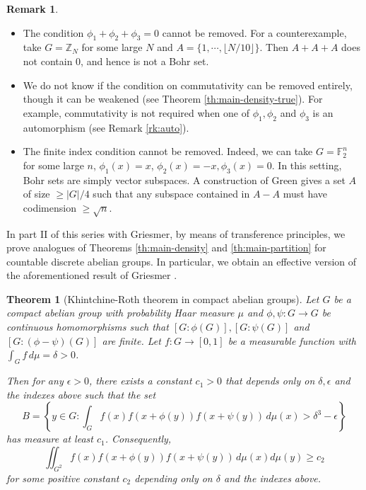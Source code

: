 \documentclass[10pt]{article}
\newtheorem{theorem}{Theorem}[section]
\theoremstyle{definition}
\newtheorem{remark}{Remark}
\newcommand{\Z}{\mathbb{Z}}
\newcommand{\F}{\mathbb{F}}
\begin{document}
\begin{remark}\label{remark:density_commutative}\
\begin{itemize}[leftmargin=*]
\item The condition $\phi_1 + \phi_2 + \phi_3 = 0$ cannot be removed. For a counterexample, take $G=\Z_N$ for some large $N$ and $A = \{1, \cdots, \lfloor N/10 \rfloor\}$. Then $A+A+A$ does not contain 0, and hence is not a Bohr set.
\item We do not know if the condition on commutativity can be removed entirely, though it can be weakened (see Theorem \ref{th:main-density-true}). For example, commutativity is not required when one of $\phi_1, \phi_2$ and $\phi_3$ is an automorphism (see Remark \ref{rk:auto}).
\item The finite index condition cannot be removed. Indeed, we can take $G = \F_2^n$ for some large $n$, $\phi_1(x)= x$, $\phi_2(x)=-x, \phi_3(x)=0$. In this setting, Bohr sets are simply vector subspaces. A construction of Green \cite[Theorem 9.4]{green-ff} gives a set $A$ of size $\geq |G|/4$ such that any subspace contained in $A-A$ must have codimension $\geq \sqrt{n}$.  
\end{itemize}
\end{remark}

In part II of this series \cite{Griesmer-Le-Le-countable} with Griesmer, by means of transference principles, we prove analogues of Theorems \ref{th:main-density} and \ref{th:main-partition} for countable discrete abelian groups. 
In particular, we obtain an effective version of the aforementioned result of Griesmer \cite{griesmer-br}. %
\setcounter{theorem}{8}\setcounter{equation}{2}
\begin{theorem}[Khintchine-Roth theorem in compact abelian groups]
\label{th:roth-khintchine}
Let $G$ be a compact abelian group with  probability Haar measure $\mu$ and $\phi, \psi: G \to G$ be continuous homomorphisms such that $[G: \phi(G)], [G: \psi(G)]$ and $[G: (\phi-\psi)(G)]$ are finite. 
Let $f: G \to [0, 1]$ be a measurable function with $\int_G f \, d \mu = \delta >0$.
 
Then for any $\epsilon > 0$, there exists a constant $c_1 >0$ that depends only on $\delta, \epsilon$ and the indexes above such that the set
\[
    B = \left\{y \in G: \int_G f(x) f(x+ \phi(y)) f(x + \psi(y)) \, d \mu(x) > \delta^3 - \epsilon \right\}
\]
has measure at least $c_1$. Consequently,
\begin{equation} \label{eq:counting-roth}
\iint_{G^2} f(x) f(x+ \phi(y)) f(x + \psi(y)) \, d \mu(x) d\mu(y) \geq c_2 
\end{equation}
for some positive constant $c_2$ depending only on $\delta$ and the indexes above.
\end{theorem}
\setcounter{equation}{4}
\end{document}
